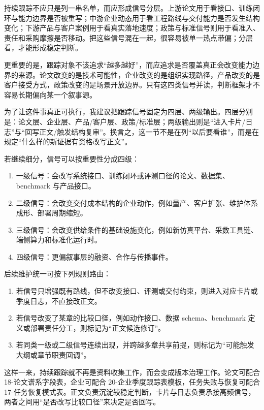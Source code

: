 持续跟踪不应只是列一串名单，而应形成信号分层。上游论文用于看接口、训练闭环与能力边界是否被重写；中游企业动态用于看工程路线与交付能力是否发生结构变化；下游产品与客户案例用于看真实落地速度；政策与标准信号则用于看准入、责任和采购摩擦是否移动。把这些信号混在一起，很容易被单一热点带偏；分层看，才能形成稳定判断。

更重要的是，跟踪对象不该追求“越多越好”，而应追求是否覆盖真正会改变能力边界的来源。论文改变的是技术可能性，企业改变的是组织实现路径，产品改变的是客户接受方式，政策改变的是场景开放边界。只有这四类信号并读，判断框架才不容易长期偏向某一个叙事源。

为了让这件事真正可执行，我建议把跟踪信号固定为四层、两级输出。四层分别是：论文层、企业层、产品/客户层、政策/标准层；两级输出则是“进入卡片/日志”与“回写正文/触发结构复审”。换言之，这一节不是在列“以后要看谁”，而是在规定“什么样的新证据有资格改写正文”。

若继续细分，信号可以按重要性分成四级：

\begin{enumerate}
\item 一级信号：会改写系统接口、训练闭环或评测口径的论文、数据集、benchmark 与产品接口。
\item 二级信号：会改变交付成本结构的企业动作，例如量产、客户扩张、维护体系成形、部署周期缩短。
\item 三级信号：会改变供给条件的基础设施变化，例如新仿真平台、采数工具链、端侧算力和标准化运行时。
\item 四级信号：更偏叙事层的融资、合作与传播事件。
\end{enumerate}

后续维护统一可按下列规则路由：

\begin{enumerate}
\item 若信号只增强既有路线，但不改变接口、评测或交付约束，则进入对应卡片或季度日志，不直接改正文。
\item 若信号改变了某章的比较口径，例如动作接口、数据 schema、benchmark 定义或部署责任分工，则标记为“正文候选修订”。
\item 若同类一级或二级信号连续出现，并跨越多章共享前提，则标记为“可能触发大纲或章节职责回调”。
\end{enumerate}

这样一来，持续跟踪就不再是资料收集工作，而会变成版本治理工作。论文可配合 18-论文谱系字段表，企业可配合 20-企业季度跟踪表模板，任务失败与恢复可配合 17-任务恢复模式表。正文负责沉淀较稳定判断，卡片与日志负责承接高频信号，两者之间用“是否改写比较口径”来决定是否回写。

